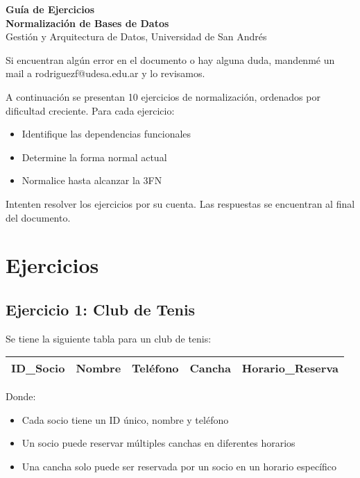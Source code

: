 \documentclass[12pt]{article}
\begin{document}
\begin{center}
  {\LARGE \textbf{Guía de Ejercicios \\ Normalización de Bases de Datos}}\\[0.5em]
  {Gestión y Arquitectura de Datos, Universidad de San Andrés}
\end{center}

Si encuentran algún error en el documento o hay alguna duda, mandenmé un mail a rodriguezf@udesa.edu.ar y lo revisamos.

\vspace{0.5em}

A continuación se presentan 10 ejercicios de normalización, ordenados por dificultad creciente. Para cada ejercicio:
\begin{itemize}
    \item Identifique las dependencias funcionales
    \item Determine la forma normal actual
    \item Normalice hasta alcanzar la 3FN
\end{itemize}

Intenten resolver los ejercicios por su cuenta. Las respuestas se encuentran al final del documento.

\section{Ejercicios}

\subsection{Ejercicio 1: Club de Tenis}
Se tiene la siguiente tabla para un club de tenis:
\vspace{0.5em}
\begin{center}
\begin{tabular}{|l|l|l|l|l|}
\hline
ID\_Socio & Nombre & Teléfono & Cancha & Horario\_Reserva \\
\hline
\end{tabular}
\end{center}

Donde:
\begin{itemize}
    \item Cada socio tiene un ID único, nombre y teléfono
    \item Un socio puede reservar múltiples canchas en diferentes horarios
    \item Una cancha solo puede ser reservada por un socio en un horario específico
\end{itemize}
\end{document}
